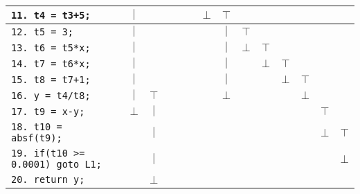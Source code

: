 \documentclass[docid=2021]{comp_exam_round1}
\begin{document}
\begin{minipage}{\textwidth}
\begin{center}
\begin{tabular}{l | c c c c c c c c c c c c c}
        \texttt{11. t4 = t3+5;}                 & $\vert$ &         &         &         &         & $\bot$  & $\top$  &         &         &         &         &         &         \\ \hline
        \texttt{12. t5 = 3;}                    & $\vert$ &         &         &         &         &         & $\vert$ & $\top$  &         &         &         &         &         \\ \hline
        \texttt{13. t6 = t5*x;}                 & $\vert$ &         &         &         &         &         & $\vert$ & $\bot$  & $\top$  &         &         &         &         \\ \hline
        \texttt{14. t7 = t6*x;}                 & $\vert$ &         &         &         &         &         & $\vert$ &         & $\bot$  & $\top$  &         &         &         \\ \hline
        \texttt{15. t8 = t7+1;}                 & $\vert$ &         &         &         &         &         & $\vert$ &         &         & $\bot$  & $\top$  &         &         \\ \hline
        \texttt{16. y = t4/t8;}                 & $\vert$ & $\top$  &         &         &         &         & $\bot$  &         &         &         & $\bot$  &         &         \\ \hline
        \texttt{17. t9 = x-y;}                  & $\bot$  & $\vert$ &         &         &         &         &         &         &         &         &         & $\top$  &         \\ \hline
        \texttt{18. t10 = absf(t9);}            &         & $\vert$ &         &         &         &         &         &         &         &         &         & $\bot$  & $\top$  \\ \hline
        \texttt{19. if(t10 >= 0.0001) goto L1;} &         & $\vert$ &         &         &         &         &         &         &         &         &         &         & $\bot$  \\ \hline
        \texttt{20. return y;}                  &         & $\bot$  &         &         &         &         &         &         &         &         &         &         &         \\
    \end{tabular}
\end{center}
\end{minipage}
\end{document}
